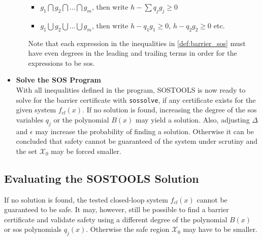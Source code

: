 \begin{itemize}
\begin{itemize}
		\begin{itemize}
			\item $g_1 \bigcap g_2 \bigcap ... \bigcap g_m$, then write $h - \sum q_jg_j\geq 0$
			\item $g_1 \bigcup g_2 \bigcup ... \bigcup g_m$, then write $h - q_1g_1\geq 0$, $h - q_2g_2\geq 0$ etc.
		\end{itemize} 
		Note that each expression in the inequalities in \autoref{def:barrier_sos} must have even degrees in the leading and trailing terms in order for the expressions to be \gls{sos}.
	\end{itemize}
	\item \textbf{Solve the SOS Program}\\
	With all inequalities defined in the program, SOSTOOLS is now ready to solve for the barrier certificate with \texttt{sossolve}, if any certificate exists for the given system $f_{cl}(x)$. If no solution is found, increasing the degree of the \gls{sos} variables $q_j$ or the polynomial $B(x)$ may yield a solution. Also, adjusting $\Delta$ and $\epsilon$ may increase the probability of finding a solution. Otherwise it can be concluded that safety cannot be guaranteed of the system under scrutiny and the set $\mathcal{X}_0$ may be forced smaller. 
\end{itemize}









\subsection{Evaluating the SOSTOOLS Solution}\label{subsec:eval_sos}
If no solution is found, the tested closed-loop system $f_{cl}(x)$ cannot be guaranteed to be safe. It may, however, still be possible to find a barrier certificate and validate safety using a different degree of the polynomial $B(x)$ or \gls{sos} polynomials $q_j(x)$. Otherwise the safe region $\mathcal{X}_0$ may have to be smaller.

